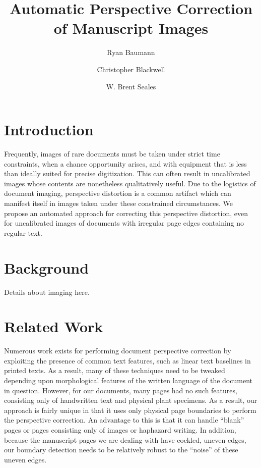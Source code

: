 \documentclass[runningheads,a4paper]{llncs}
\begin{document}
\mainmatter

\title{Automatic Perspective Correction of Manuscript Images}

\author{Ryan Baumann \and Christopher Blackwell \and W. Brent Seales}


\maketitle

\section{Introduction}

Frequently, images of rare documents must be taken under strict time constraints, 
when a chance opportunity arises, and with equipment that is less than ideally suited 
for precise digitization. This can often result in uncalibrated images
whose contents are nonetheless qualitatively useful. Due to the logistics of document
imaging, perspective distortion is a common artifact which can manifest itself in
images taken under these constrained circumstances. We propose an automated approach for
correcting this perspective distortion, even for uncalibrated images of documents
with irregular page edges containing no regular text.

\section{Background}

Details about imaging here.

\section{Related Work}

Numerous work exists for performing document perspective correction by exploiting the presence of
common text features, such as linear text baselines in printed texts.
As a result, many of these techniques need to be tweaked depending upon morphological features of
the written language of the document in question.
However, for our documents,
many pages had no such features, consisting only of handwritten text and physical plant
specimens. As a result, our approach is fairly unique in that it uses only physical page boundaries to
perform the perspective correction. An advantage to this is that it can handle “blank” pages or pages
consisting only of images or haphazard writing. In addition, because the manuscript pages we are dealing with have
cockled, uneven edges, our boundary detection needs to be relatively robust to the “noise” of these uneven edges.
\end{document}
